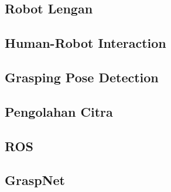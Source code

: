 \subsection{Robot Lengan}

\subsection{Human-Robot Interaction}

\subsection{Grasping Pose Detection}

\subsection{Pengolahan Citra}

\subsection{ROS}

\subsection{GraspNet}